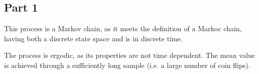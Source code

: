 \subsection{Part 1}

This process is a Markov chain, as it meets the definition of a Markoc chain,
having both a discrete state space and is in discrete time.

The process is ergodic, as its properties are not time dependent. The mean value
is achieved through a sufficiently long sample (i.e. a large number of coin
flips).
